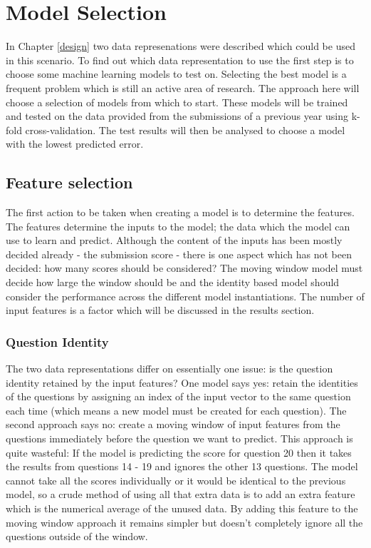 \chapter{Model Selection}
\label{machinelearning}
In Chapter \ref{design} two data represenations were described which could be used in this scenario. To find out which data representation to use the first step is to choose some machine learning models to test on. Selecting the best model is a frequent problem which is still an active area of research. The approach here will choose a selection of models from which to start. These models will be trained and tested on the data provided from the submissions of a previous year using k-fold cross-validation. The test results will then be analysed to choose a model with the lowest predicted error. 

\section{Feature selection}
The first action to be taken when creating a model is to determine the features. The features determine the inputs to the model; the data which the model can use to learn and predict. Although the content of the inputs has been mostly decided already - the submission score - there is one aspect which has not been decided: how many scores should be considered? The moving window model must decide how large the window should be and the identity based model should consider the performance across the different model instantiations. The number of input features is a factor which will be discussed in the results section.

\subsection{Question Identity}
The two data representations differ on essentially one issue: is the question identity retained by the input features? One model says yes: retain the identities of the questions by assigning an index of the input vector to the same question each time (which means a new model must be created for each question). The second approach says no: create a moving window of input features from the questions immediately before the question we want to predict. This approach is quite wasteful: If the model is predicting the score for question 20 then it takes the results from questions 14 - 19 and ignores the other 13 questions. The model cannot take all the scores individually or it would be identical to the previous model, so a crude method of using all that extra data is to add an extra feature which is the numerical average of the unused data. By adding this feature to the moving window approach it remains simpler but doesn't completely ignore all the questions outside of the window.

